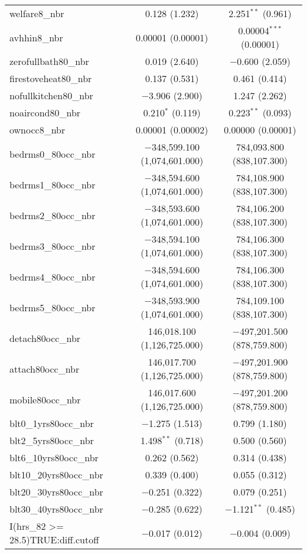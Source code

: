 \documentclass{article}
\begin{document}
\begin{table}[!htbp]
\begin{tabular}{@{\extracolsep{5pt}}lcc}
  welfare8\_nbr & 0.128 (1.232) & 2.251$^{**}$ (0.961) \\ 
  avhhin8\_nbr & 0.00001 (0.00001) & 0.00004$^{***}$ (0.00001) \\ 
  zerofullbath80\_nbr & 0.019 (2.640) & $-$0.600 (2.059) \\ 
  firestoveheat80\_nbr & 0.137 (0.531) & 0.461 (0.414) \\ 
  nofullkitchen80\_nbr & $-$3.906 (2.900) & 1.247 (2.262) \\ 
  noaircond80\_nbr & 0.210$^{*}$ (0.119) & 0.223$^{**}$ (0.093) \\ 
  ownocc8\_nbr & 0.00001 (0.00002) & 0.00000 (0.00001) \\ 
  bedrms0\_80occ\_nbr & $-$348,599.100 (1,074,601.000) & 784,093.800 (838,107.300) \\ 
  bedrms1\_80occ\_nbr & $-$348,594.600 (1,074,601.000) & 784,108.900 (838,107.300) \\ 
  bedrms2\_80occ\_nbr & $-$348,593.600 (1,074,601.000) & 784,106.200 (838,107.300) \\ 
  bedrms3\_80occ\_nbr & $-$348,594.100 (1,074,601.000) & 784,106.300 (838,107.300) \\ 
  bedrms4\_80occ\_nbr & $-$348,594.600 (1,074,601.000) & 784,106.300 (838,107.300) \\ 
  bedrms5\_80occ\_nbr & $-$348,593.900 (1,074,601.000) & 784,109.100 (838,107.300) \\ 
  detach80occ\_nbr & 146,018.100 (1,126,725.000) & $-$497,201.500 (878,759.800) \\ 
  attach80occ\_nbr & 146,017.700 (1,126,725.000) & $-$497,201.900 (878,759.800) \\ 
  mobile80occ\_nbr & 146,017.600 (1,126,725.000) & $-$497,201.200 (878,759.800) \\ 
  blt0\_1yrs80occ\_nbr & $-$1.275 (1.513) & 0.799 (1.180) \\ 
  blt2\_5yrs80occ\_nbr & 1.498$^{**}$ (0.718) & 0.500 (0.560) \\ 
  blt6\_10yrs80occ\_nbr & 0.262 (0.562) & 0.314 (0.438) \\ 
  blt10\_20yrs80occ\_nbr & 0.339 (0.400) & 0.055 (0.312) \\ 
  blt20\_30yrs80occ\_nbr & $-$0.251 (0.322) & 0.079 (0.251) \\ 
  blt30\_40yrs80occ\_nbr & $-$0.285 (0.622) & $-$1.121$^{**}$ (0.485) \\ 
  I(hrs\_82 \textgreater = 28.5)TRUE:diff.cutoff & $-$0.017 (0.012) & $-$0.004 (0.009) \\ 

\end{tabular}
\end{table}
\end{document}

